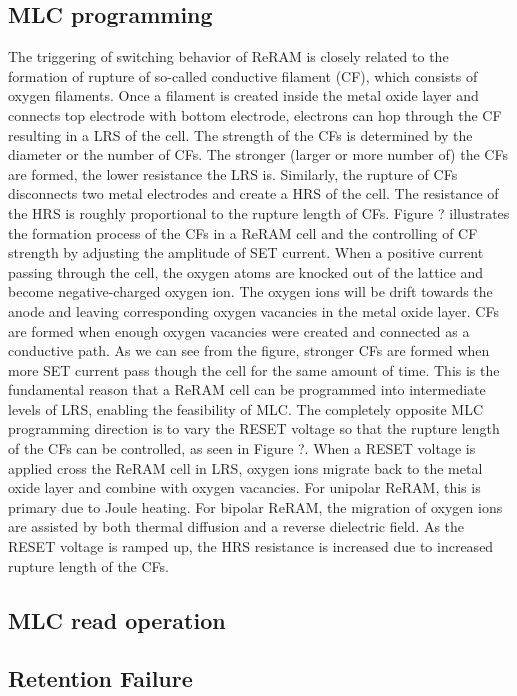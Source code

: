 \subsection{MLC programming}
The triggering of switching behavior of ReRAM is closely related to the formation of rupture of so-called conductive filament (CF), which consists of oxygen filaments. Once a filament is created inside the metal oxide layer and connects top electrode with bottom electrode, electrons can hop through the CF resulting in a LRS of the cell. The strength of the CFs is determined by the diameter or the number of CFs. The stronger (larger or more number of) the CFs are formed, the lower resistance the LRS is. Similarly, the rupture of CFs disconnects two metal electrodes and create a HRS of the cell. The resistance of the HRS is roughly proportional to the rupture length of CFs. Figure ? illustrates the formation process of the CFs in a ReRAM cell and the controlling of CF strength by adjusting the amplitude of SET current. When a positive current passing through the cell, the oxygen atoms are knocked out of the lattice and become negative-charged oxygen ion. The oxygen ions will be drift towards the anode and leaving corresponding oxygen vacancies in the metal oxide layer. CFs are formed when enough oxygen vacancies were created and connected as a conductive path. As we can see from the figure, stronger CFs are formed when more SET current pass though the cell for the same amount of time. This is the fundamental reason that a ReRAM cell can be programmed into intermediate levels of LRS, enabling the feasibility of MLC. The completely opposite MLC programming direction is to vary the RESET voltage so that the rupture length of the CFs can be controlled, as seen in Figure ?. When a RESET voltage is applied cross the ReRAM cell in LRS, oxygen ions migrate back to the metal oxide layer and combine with oxygen vacancies. For unipolar ReRAM, this is primary due to Joule heating. For bipolar ReRAM, the migration of oxygen ions are assisted by both thermal diffusion and a reverse dielectric field. As the RESET voltage is ramped up, the HRS resistance is increased due to increased rupture length of the CFs.

\subsection{MLC read operation}

\subsection{Retention Failure}

